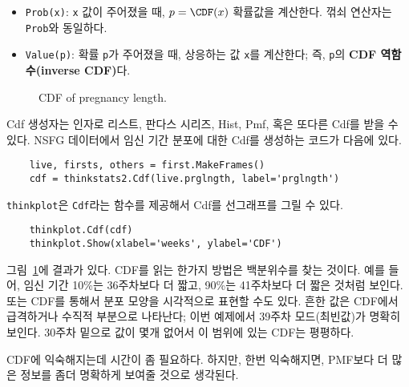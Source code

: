 \begin{itemize}

\item {\tt Prob(x)}: {\tt x} 값이 주어졌을 때, $p = \CDF(x)$ 확률값을 계산한다. 꺾쇠 연산자는 {\tt Prob}와 동일하다.

\item {\tt Value(p)}: 확률 {\tt p}가 주어졌을 때, 
상응하는 값 {\tt x}를 계산한다; 즉, {\tt p}의 {\bf CDF 역함수(inverse CDF)}다.

\end{itemize}

\begin{figure}
\caption{CDF of pregnancy length.}
\label{cumulative_prglngth_cdf}
\end{figure}

Cdf 생성자는 인자로 리스트, 판다스 시리즈, Hist, Pmf, 혹은 또다른 Cdf를 받을 수 있다. NSFG 데이터에서 임신 기간 분포에 대한 Cdf를 생성하는 코드가 다음에 있다. 


\begin{verbatim}
    live, firsts, others = first.MakeFrames()
    cdf = thinkstats2.Cdf(live.prglngth, label='prglngth')
\end{verbatim}


{\tt thinkplot}은 {\tt Cdf}라는 함수를 제공해서 Cdf를 선그래프를 그릴 수 있다.

\begin{verbatim}
    thinkplot.Cdf(cdf)
    thinkplot.Show(xlabel='weeks', ylabel='CDF')
\end{verbatim}



그림~\ref{cumulative_prglngth_cdf}에 결과가 있다.
CDF를 읽는 한가지 방법은 백분위수를 찾는 것이다.
예를 들어, 임신 기간 10\%는 36주차보다 더 짧고, 90\%는 41주차보다 더 짧은 것처럼 보인다. 또는 CDF를 통해서 분포 모양을 시각적으로 표현할 수도 있다. 흔한 값은 CDF에서 급격하거나 수직적 부분으로 나타난다; 이번 예제에서 39주차 모드(최빈값)가 명확히 보인다. 30주차 밑으로 값이 몇개 없어서 이 범위에 있는 CDF는 평평하다.

CDF에 익숙해지는데 시간이 좀 필요하다. 하지만, 한번 익숙해지면, PMF보다 더 많은 정보를 좀더 명확하게 보여줄 것으로 생각된다.


